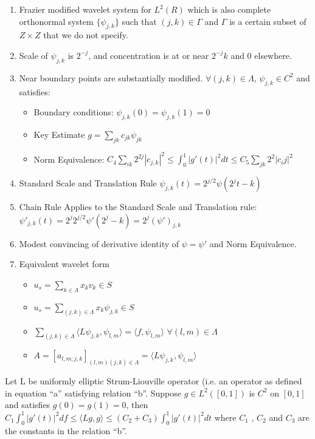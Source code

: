 \documentclass[11pt]{article}
\begin{document}
\begin{enumerate}
\item Frazier modified wavelet system for $L^2(R)$ which is also complete orthonormal system $\{\psi_{j,k}\}$ such that $(j,k)\in \Gamma$ and $\Gamma$ is a certain subset of $Z\times Z$ that we do not specify.  
\item Scale of $\psi_{j,k}$ is $2^{-j}$, and concentration is at or near $2^{-j}k$ and 0 elsewhere.
\item Near boundary points are substantially modified.  $\forall (j,k) \in \Lambda$, $\psi_{j,k} \in C^2$ and satisfies: 
\begin{itemize}
\item Boundary conditions:  $\psi _{j,k} (0) = \psi _{j,k} (1) = 0$
\item Key Estimate $g=\sum_{jk} c_{jk} \psi _{jk} $ 
\item Norm Equivalence: $C_4 \sum _{ik} 2^{2j} |c_{j,k} | ^2 \le \int ^1 _ 0 |g'(t)| ^2 dt \le C_5 \sum _{jk} 2^2 |c_ij |^2 $
\end{itemize}
\item Standard Scale and Translation Rule $\psi_{j,k} (t) = 2^{j/2} \psi (2^j t - k) $
\item Chain Rule Applies to the Standard Scale and Translation rule: $\psi' _ {j,k} (t) = 2^j 2^{j/2} \psi' (2^j -k ) = 2^j (\psi ')_{j,k}$ 
\item Modest convincing of derivative identity of $\psi=\psi'$ and Norm Equivalence.   
\item Equivalent wavelet form 
\begin{itemize}
\item $u_s = \sum _{k\in \Lambda } x_k v_k \in S$
\item $u_s = \sum _{(j,k)\in \Lambda } x_k \psi_{j,k} \in S$
\item $\sum _{(j,k)\in \Lambda } \langle L\psi_{j,k} , \psi _{l,m} \rangle = \langle f , \psi _{l,m} \rangle $  $\forall (l,m) \in \Lambda$
\item $A=[a_{l,m;j,k} ] _{(l,m)(j,k) \in \Lambda} =  \langle L\psi_{j,k} , \psi _{l,m} \rangle $
\end{itemize}


\end{enumerate}


Let L be uniformly elliptic Strum-Liouville operator (i.e. an operator as defined in equation ``a'' satisfying relation ``b''.
Suppose $g\in L^2([0,1])$ is $C^2$ on $[0,1]$ and satisfies $g(0)=g(1)=0$, then $C_1 \int ^1_0 |g'(t)|^2 df \le \langle Lg,g \rangle \le (C_2 + C_3) \int ^1 _0 |g'(t)|^2 dt$
where  $C_1$ , $C_2$ and $C_3$ are the constants in the relation ``b''.
\end{document}
